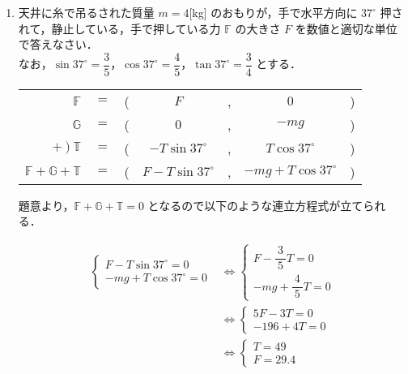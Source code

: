 \documentclass[a4paper,11pt]{ltjsarticle}
\begin{document}
\begin{enumerate}
  \item 天井に糸で吊るされた質量 $m=4$[kg] のおもりが，手で水平方向に $37^{\circ}$ 押されて，静止している，手で押している力 $\mathbb{F}$ の大きさ $F$ を数値と適切な単位で答えなさい．\\
  なお，$\sin 37^{\circ}=\dfrac{3}{5}$，$\cos 37^{\circ}=\dfrac{4}{5}$，$\tan 37^{\circ}=\dfrac{3}{4}$ とする．
  \begin{table}[hb]
    \centering
    \begin{tabular}{rcccccc}
      $\mathbb{F}$ & $=$ & ( & $F$ & ,& $0$ & ) \\
      $\mathbb{G}$ & $=$ & ( & $0$ & ,& $-mg$ & ) \\
      $+\ )\ \mathbb{T}$ & $=$ & ( & $-T \sin 37^{\circ}$ & ,& $T \cos 37^{\circ}$ & ) \\
    \hline
      $\mathbb{F+G+T}$ & $=$ & ( & $F-T \sin 37^{\circ}$ & ,& $-mg+T \cos 37^{\circ}$ & ) \\
    \end{tabular}
  \end{table}

\clearpage

題意より，$\mathbb{F+G+T} = 0$ となるので以下のような連立方程式が立てられる．

  \begin{equation*}
    \begin{aligned}
      \begin{cases}
        F-T \sin 37^{\circ} = 0 \\
        -mg+T \cos 37^{\circ} = 0
      \end{cases}
      &\Leftrightarrow
      \begin{cases}
        F-\dfrac{3}{\ 5\ }T = 0 \\
        -mg+\dfrac{4}{\ 5\ }T = 0
      \end{cases} \\
      &\Leftrightarrow
      \begin{cases}
        5F - 3T = 0 \\
        -196 + 4T = 0
      \end{cases} \\
      &\Leftrightarrow
      \begin{cases}
        T = 49 \\
        F = 29.4
      \end{cases} \\
    \end{aligned}
  \end{equation*}


\end{enumerate}
\end{document}
